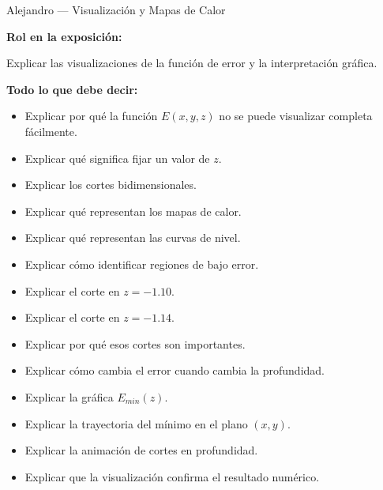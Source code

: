\documentclass[aspectratio=169]{beamer}
\begin{document}
\begin{frame}{Alejandro — Visualización y Mapas de Calor}

\textbf{Rol en la exposición:}

Explicar las visualizaciones de la función de error y la interpretación gráfica.

\vspace{0.4cm}

\textbf{Todo lo que debe decir:}

\begin{itemize}
    \item Explicar por qué la función $E(x,y,z)$ no se puede visualizar completa fácilmente.
    \item Explicar qué significa fijar un valor de $z$.
    \item Explicar los cortes bidimensionales.
    \item Explicar qué representan los mapas de calor.
    \item Explicar qué representan las curvas de nivel.
    \item Explicar cómo identificar regiones de bajo error.
    \item Explicar el corte en $z=-1.10$.
    \item Explicar el corte en $z=-1.14$.
    \item Explicar por qué esos cortes son importantes.
    \item Explicar cómo cambia el error cuando cambia la profundidad.
    \item Explicar la gráfica $E_{min}(z)$.
    \item Explicar la trayectoria del mínimo en el plano $(x,y)$.
    \item Explicar la animación de cortes en profundidad.
    \item Explicar que la visualización confirma el resultado numérico.
\end{itemize}

\end{frame}

\end{document}
